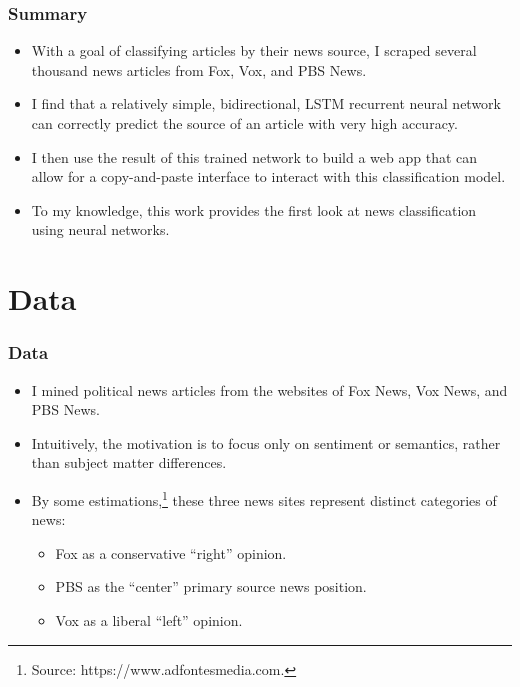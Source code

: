 \documentclass{beamer}
\begin{document}
    \begin{frame}
    	\frametitle{Summary}
    	\begin{itemize}
    		\item With a goal of classifying articles by their news source, I scraped several thousand news articles from Fox, Vox, and PBS News.
    		\item I find that a relatively simple, bidirectional, LSTM recurrent neural network can  correctly predict the source of an article with very high accuracy. 
    		\item I then use the result of this trained network to build a web app that can allow for a copy-and-paste interface to interact with this classification model. 
    		\item To my knowledge, this work provides the first look at news classification using neural networks. 
    	\end{itemize}
    \end{frame}


\section{Data}

    \begin{frame}
    	\frametitle{Data}
    	\begin{itemize}
    		\item I mined political news articles from the websites of Fox News, Vox News, and PBS News. 
    		\item Intuitively, the motivation is to focus only on sentiment or semantics, rather than subject matter differences.
    		\item By some estimations,\footnote{Source: https://www.adfontesmedia.com.} these three news sites represent distinct categories of news: 
    		\begin{itemize}
    			\item Fox as a conservative “right” opinion. 
    			\item PBS as the “center” primary source news position. 
    			\item Vox as a liberal “left” opinion.
    		\end{itemize} 
    	\end{itemize}
    \end{frame}
\end{document}
